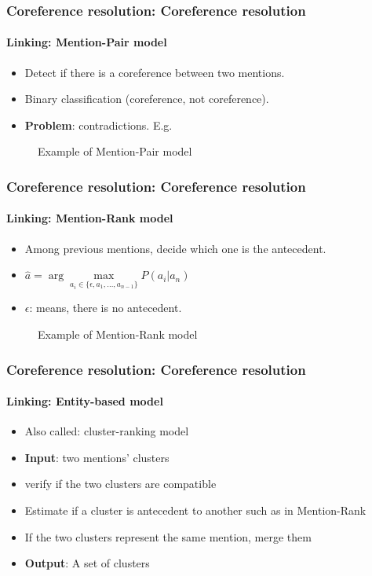 \documentclass[xcolor=table]{beamer}
\begin{document}
\begin{frame}
	\frametitle{Coreference resolution: Coreference resolution}
	\framesubtitle{Linking: Mention-Pair model}
	
	\begin{itemize}
		\item Detect if there is a coreference between two mentions.
		\item Binary classification (coreference, not coreference).
		\item \textbf{Problem}: contradictions. E.g. 
	\end{itemize}
	\begin{figure}
		\centering
		\caption{Example of Mention-Pair model \cite{2019-jurafsky-martin}}
	\end{figure}
	
\end{frame}

\begin{frame}
	\frametitle{Coreference resolution: Coreference resolution}
	\framesubtitle{Linking: Mention-Rank model}
	
	\begin{itemize}
		\item Among previous mentions, decide which one is the antecedent.
		\item $ \hat{a} = \arg\max\limits_{a_i \in \{\epsilon, a_1, \ldots, a_{n-1}\}} P(a_i|a_n) $
		\item $ \epsilon $: means, there is no antecedent.
	\end{itemize}
	\begin{figure}
		\centering
		\caption{Example of Mention-Rank model \cite{2019-jurafsky-martin}}
	\end{figure}
	
\end{frame}

\begin{frame}
	\frametitle{Coreference resolution: Coreference resolution}
	\framesubtitle{Linking: Entity-based model}
	
	\begin{itemize}
		\item Also called: cluster-ranking model
		\item \textbf{Input}: two mentions' clusters
		\item verify if the two clusters are compatible
		\item Estimate if a cluster is antecedent to another such as in Mention-Rank
		\item If the two clusters represent the same mention, merge them
		\item \textbf{Output}: A set of clusters
	\end{itemize}
	
\end{frame}
\end{document}
